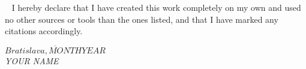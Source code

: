 
~
\vfill
I hereby declare that I have created this work completely on my own and used no other sources or tools than the ones listed, and that I have marked any citations accordingly.

\begin{flushright}
\vspace{12mm}
$\overline{Bratislava, MONTH \mathit{YEAR}}$\\
\textit{YOUR NAME}
\end{flushright}
